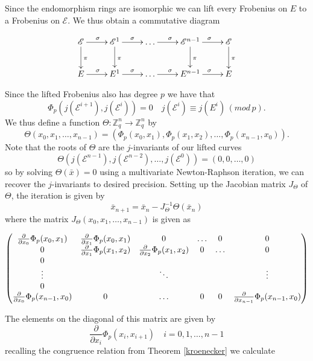 Since the endomorphism rings are isomorphic we can lift every Frobenius on $E$ to a
Frobenius on $\mathscr{E}$. We thus obtain a commutative diagram

$$
\xymatrix {
  \mathscr{E} \ar[d]^\pi \ar[r]^\sigma & \mathscr{E}^1 \ar[d]^\pi \ar[r]^\sigma & \ldots \ar[r]^\sigma & \mathscr{E}^{n-1} \ar[d]^\pi \ar[r]^\sigma & \mathscr{E} \ar[d]^\pi \\
  E \ar[r]^\sigma & E^1 \ar[r]^\sigma &\ldots \ar[r]^\sigma & E^{n-1} \ar[r]^\sigma & E \\
}
$$

Since the lifted Frobenius also has degree $p$ we have that
$$\Phi_p(j(\mathscr{E}^{i+1}), j(\mathscr{E}^{i})) = 0 \quad j(\mathscr{E}^i) \equiv j(E^i) \, (mod\, p). $$
We thus define a function $\Theta: \mathbb{Z}_q^n \rightarrow \mathbb{Z}_q^n$ by
$$\Theta(x_0, x_1, \ldots, x_{n-1}) = (\Phi_p(x_0, x_1), \Phi_p(x_1, x_2), \ldots, \Phi_p(x_{n-1}, x_0)).$$
Note that the roots of $\Theta$ are the $j$-invariants of our lifted curves
$$\Theta(j(\mathscr{E}^{n-1}), j(\mathscr{E}^{n-2}), \ldots, j(\mathscr{E}^0)) = (0, 0, \ldots, 0) $$
so by solving $\Theta(\bar{x}) = 0$ using a multivariate Newton-Raphson iteration, we can
recover the $j$-invariants to desired precision. Setting up the Jacobian matrix $J_\Theta$
of $\Theta$, the iteration is given by
$$ \bar{x}_{n+1} = \bar{x}_n - J_\Theta^{-1} \Theta(\bar{x}_n) $$
where the matrix $J_\Theta(x_0, x_1, \ldots, x_{n-1})$ is given as 

$$
\begin{pmatrix}
  {\partial \over \partial x_0} \Phi_p(x_0, x_1) & {\partial \over \partial x_1} \Phi_p(x_0, x_1) & 0 & \ldots & 0 & 0 \\
  0 & {\partial \over \partial x_1} \Phi_p(x_1, x_2) & {\partial \over \partial x_2} \Phi_p(x_1, x_2) & 0 & \ldots & 0 \\
  0 \\
  \vdots & & \ddots & & & \vdots \\
  0 \\
  {\partial \over \partial x_0} \Phi_p(x_{n-1}, x_0) & 0 & \ldots & 0 & 0 & {\partial \over \partial x_{n-1}} \Phi_p(x_{n-1}, x_0) \\
\end{pmatrix}
$$

The elements on the diagonal of this matrix are given by
$$ \frac{\partial}{\partial x_i} \Phi_p(x_i, x_{i+1}) \quad i =  0, 1, \ldots, n-1$$
recalling the congruence relation from Theorem \ref{kroenecker} we calculate

